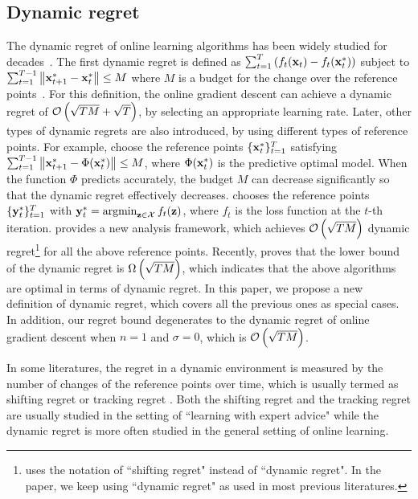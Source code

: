 \documentclass{article}
\begin{document}
\subsection{Dynamic regret}
The dynamic regret of online learning algorithms  has been widely studied for decades~\citep{Zinkevich:2003,Hall:2015ct,Hall:2013vr,Jadbabaie:2015wg,Yang:2016ud,Bedi:2018te,Zhang:2016wl,Mokhtari:2016jz,Zhang:2018tu,Gyorgy:2016,NIPS2016_6536,Zhao:2018wx}.  
The first dynamic regret is defined as $\sum_{t=1}^T \left(  f_{t}({\bf x}_{t}) - f_{t}({\bf x}_t^\ast)  \right)$ subject to $\sum_{t=1}^{T-1} \left\lVert{\bf x}_{t+1}^\ast - {\bf x}_t^\ast\right\rVert \le M$ where $M$ is a budget for the change over the reference points~\citep{Zinkevich:2003}.
For this definition, the online gradient descent can achieve a dynamic regret of ${\mathcal{O}\left( \sqrt{TM}+\sqrt{T} \right)}$, by selecting an appropriate learning rate. 
Later, other types of dynamic regrets are also introduced, by using different types of reference points.
For example, \citet{Hall:2015ct,Hall:2013vr} choose the reference points $\{{\bf x}_t^{\ast}\}_{t=1}^T$ satisfying $\sum_{t=1}^{T-1} \left\lVert{\bf x}_{t+1}^\ast - \Phi({\bf x}_t^\ast)\right\rVert \le M$, where $\Phi({\bf x}_t^\ast)$ is the predictive optimal model. When the function $\Phi$ predicts accurately, the budget $M$ can decrease significantly so that the dynamic regret effectively decreases. \citet{Jadbabaie:2015wg,Yang:2016ud,Bedi:2018te,Zhang:2016wl,Mokhtari:2016jz,Zhang:2018tu} chooses the reference points $\{{\bf y}_t^{\ast}\}_{t=1}^T$ with $\y_t^{\ast} = \argmin_{\z\in\Xcal} f_t(\z)$, where $f_t$ is the loss function at the $t$-th iteration. \citet{Gyorgy:2016} provides a new analysis framework, which achieves ${\mathcal{O}\left( \sqrt{TM} \right)}$ dynamic regret\footnote{\citet{Gyorgy:2016} uses the notation of ``shifting regret" instead of ``dynamic regret". In the paper, we keep using ``dynamic regret" as used in most previous literatures. } for all the above reference points. Recently, \citet{Zhao:2018wx} proves that the lower bound of the dynamic regret is $\Omega\left( \sqrt{TM} \right)$, which indicates that the above algorithms are optimal in terms of dynamic regret.
In this paper, we propose a new definition of dynamic regret, which covers all the previous ones as special cases.
In addition, our regret bound degenerates to the dynamic regret of online gradient descent when $n=1$ and $\sigma = 0$, which is ${\mathcal{O}\left( \sqrt{TM} \right)}$. 

In some literatures, the regret in a dynamic environment is measured by the number of changes of the reference points over time, which is usually termed as shifting regret or tracking regret \citep{Herbster1998,Gyorgy:2005wo,Gyorgy:2012wa,Gyorgy:2016,Mourtada:2017vn,JMLR:v17:13-533,NIPS2016_6536,cesabianchi:hal,pmlr-v84-mohri18a,pmlr-v54-jun17a}. Both the shifting regret and the tracking regret are usually studied in the setting of ``learning with expert advice" while the dynamic regret is more often studied in the general setting of online learning.
\end{document}
